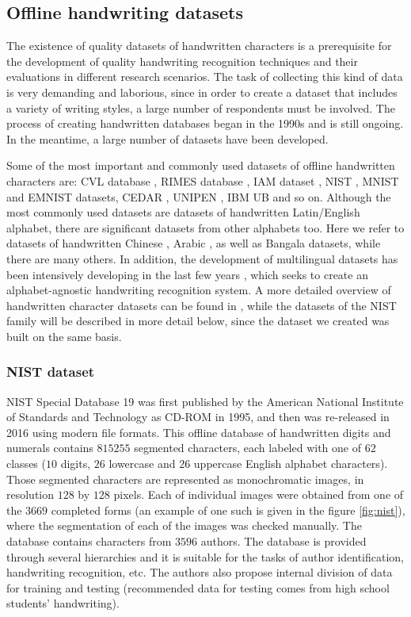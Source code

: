 \documentclass[eng]{simposium}
\begin{document}
\subsection{Offline handwriting datasets}

The existence of quality datasets of handwritten characters is a prerequisite for the development of quality handwriting 
recognition techniques and their evaluations in different research scenarios. 
The task of collecting this kind of data is very demanding and laborious, since in order to create a dataset that includes 
a variety of writing styles, a large number of respondents must be involved. 
The process of creating handwritten databases began in the 1990s\cite{9} and is still ongoing. 
In the meantime, a large number of datasets have been developed. 

Some of the most important and commonly used datasets of offline handwritten characters are: CVL database \cite{18}, RIMES database \cite{10},
IAM dataset \cite{11}, 
NIST \cite{12}\cite{13}, MNIST \cite{8} and EMNIST \cite{1} datasets, CEDAR \cite{14}, UNIPEN \cite{15}, IBM UB \cite{16} and so on. 
Although the most commonly used datasets are datasets of handwritten Latin/English alphabet, 
there are significant datasets from other alphabets too. 
Here we refer to datasets of handwritten Chinese \cite{19}\cite{20}\cite{21}, Arabic \cite{22}\cite{23}, as well as Bangala \cite{24}\cite{25} datasets,
while there are many others. 
In addition, the development of multilingual datasets has been intensively developing in the last few years \cite{17}\cite{26}\cite{18},
which seeks to create an alphabet-agnostic handwriting recognition system. 
A more detailed overview of handwritten character datasets can be found in \cite{9}, 
while the datasets of the NIST family will be described in more detail below, since the dataset we created was built on the same basis. 

\subsubsection{NIST dataset}

NIST Special Database 19 \cite{12}\cite{13} was first published by the American National Institute of Standards and Technology as CD-ROM in 1995, and then was 
re-released in 2016 using modern file formats. 
This offline database of handwritten digits and numerals contains $815255$ segmented characters, each labeled 
with one of $62$ classes ($10$ digits, $26$ lowercase and $26$ uppercase English alphabet characters). 
Those segmented characters are represented as monochromatic images, in resolution $128$ by $128$ pixels. 
Each of individual images were obtained from one of the $3669$ completed forms (an example of one such is given in the figure \ref{fig:nist}), 
where the segmentation of each of the images was checked manually. 
The database contains characters from $3596$ authors. 
The database is provided through several hierarchies and it is suitable for the tasks of author identification, handwriting recognition, etc. 
The authors also propose internal division of data for training and testing 
(recommended data for testing comes from high school students' handwriting). 
\end{document}
